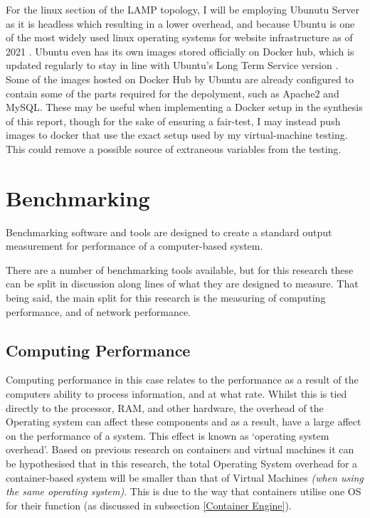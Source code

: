 For the linux section of the LAMP topology, I will be employing Ubunutu Server as it is headless which resulting in a lower overhead, and because Ubuntu is one of the most widely used linux operating systems for website infrastructure as of 2021 \citep{w3techUbuntu}. Ubuntu even has its own images stored officially on Docker hub, which is updated regularly to stay in line with Ubuntu's Long Term Service version \citep{ubuntuDocker}. Some of the images hosted on Docker Hub by Ubuntu \citep{ubuntuDockerProfile} are already configured to contain some of the parts required for the depolyment, such as Apache2 and MySQL. These may be useful when implementing a Docker setup in the synthesis of this report, though for the sake of ensuring a fair-test, I may instead push images to docker that use the exact setup used by my virtual-machine testing. This could remove a possible source of extraneous variables from the testing.

\section{Benchmarking}
\label{sec:Benchmarking}
Benchmarking software and tools are designed to create a standard output measurement for performance of a computer-based system\citep{fleming1986}.

There are a  number of benchmarking tools available, but for this research these can be split in discussion along lines of what they are designed to measure. That being said, the main split for this research is the measuring of computing performance, and of network performance.

\subsection{Computing Performance}
\label{computingperformance}
Computing performance in this case relates to the performance as a result of the computers ability to process information, and at what rate. Whilst this is tied directly to the processor, RAM, and other hardware, the overhead of the Operating system can affect these components and as a result, have a large affect on the performance of a system. This effect is known as `operating system overhead'. Based on previous research on containers and virtual machines it can be hypothesised that in this research, the total Operating System overhead for a container-based system will be smaller than that of Virtual Machines \emph{(when using the same operating system)}. This is due to the way that containers utilise one OS for their function (as discussed in subsection \ref{Container Engine}).

